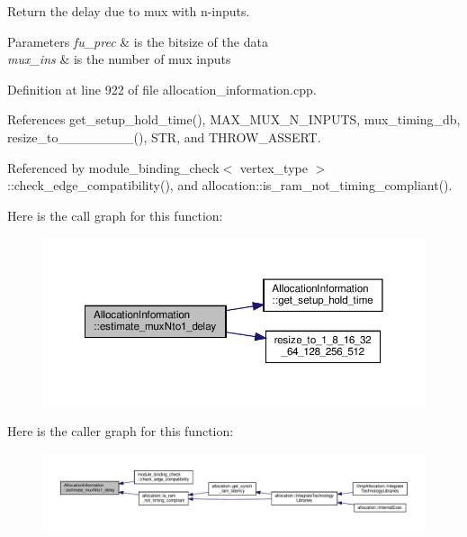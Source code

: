 Return the delay due to mux with n-\/inputs. 


\begin{DoxyParams}{Parameters}
{\em fu\+\_\+prec} & is the bitsize of the data \\
\hline
{\em mux\+\_\+ins} & is the number of mux inputs \\
\hline
\end{DoxyParams}


Definition at line 922 of file allocation\+\_\+information.\+cpp.



References get\+\_\+setup\+\_\+hold\+\_\+time(), M\+A\+X\+\_\+\+M\+U\+X\+\_\+\+N\+\_\+\+I\+N\+P\+U\+TS, mux\+\_\+timing\+\_\+db, resize\+\_\+to\+\_\+\_\+\_\+\_\+\_\+\_\+\_\+\_(), S\+TR, and T\+H\+R\+O\+W\+\_\+\+A\+S\+S\+E\+RT.



Referenced by module\+\_\+binding\+\_\+check$<$ vertex\+\_\+type $>$\+::check\+\_\+edge\+\_\+compatibility(), and allocation\+::is\+\_\+ram\+\_\+not\+\_\+timing\+\_\+compliant().

Here is the call graph for this function\+:
\nopagebreak
\begin{figure}[H]
\begin{center}
\leavevmode
\includegraphics[width=350pt]{d7/d79/classAllocationInformation_a395eb7ee43f8d119ec00f900af66b8cd_cgraph}
\end{center}
\end{figure}
Here is the caller graph for this function\+:
\nopagebreak
\begin{figure}[H]
\begin{center}
\leavevmode
\includegraphics[width=350pt]{d7/d79/classAllocationInformation_a395eb7ee43f8d119ec00f900af66b8cd_icgraph}
\end{center}
\end{figure}
\mbox{\label{classAllocationInformation_af60a2374f76674223eba6246e474f63c}} 
